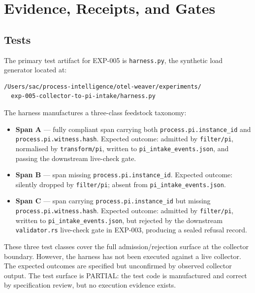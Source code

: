 \section{Evidence, Receipts, and Gates}
\label{sec:otel-weaver-exp-005-collector-to-intake-evidence}

\subsection{Tests}
\label{sec:otel-weaver-exp-005-collector-to-intake-evidence-tests}

The primary test artifact for EXP-005 is \texttt{harness.py}, the synthetic load generator
located at:
\begin{verbatim}
/Users/sac/process-intelligence/otel-weaver/experiments/
  exp-005-collector-to-pi-intake/harness.py
\end{verbatim}

The harness manufactures a three-class feedstock taxonomy:

\begin{itemize}
  \item \textbf{Span A} --- fully compliant span carrying both \texttt{process.pi.instance\_id}
        and \texttt{process.pi.witness.hash}. Expected outcome: admitted by \texttt{filter/pi},
        normalised by \texttt{transform/pi}, written to \texttt{pi\_intake\_events.json}, and
        passing the downstream live-check gate.
  \item \textbf{Span B} --- span missing \texttt{process.pi.instance\_id}. Expected outcome:
        silently dropped by \texttt{filter/pi}; absent from \texttt{pi\_intake\_events.json}.
  \item \textbf{Span C} --- span carrying \texttt{process.pi.instance\_id} but missing
        \texttt{process.pi.witness.hash}. Expected outcome: admitted by \texttt{filter/pi},
        written to \texttt{pi\_intake\_events.json}, but rejected by the downstream
        \texttt{validator.rs} live-check gate in EXP-003, producing a sealed refusal record.
\end{itemize}

These three test classes cover the full admission/rejection surface at the collector boundary.
However, the harness has not been executed against a live collector. The expected outcomes are
specified but unconfirmed by observed collector output. The test surface is PARTIAL: the test
code is manufactured and correct by specification review, but no execution evidence exists.

